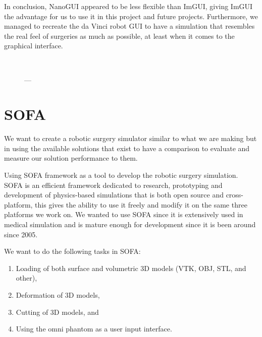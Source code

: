 \begin{center}
  \setlength{\fboxsep}{0pt}%
  \setlength{\fboxrule}{0.1pt}%
\end{center}

In conclusion, NanoGUI appeared to be less flexible than ImGUI, giving ImGUI the advantage for us to use it in this project and future projects. Furthermore, we managed to recreate the da Vinci robot GUI to have a simulation that resembles the real feel of surgeries as much as possible, at least when it comes to the graphical interface.

\begin{figure}
  \centering%
  \setlength{\fboxsep}{0pt}%
  \setlength{\fboxrule}{0.1pt}%
  \\[1ex]
  \caption{---}\label{fig:}
\end{figure}



\section{SOFA}\label{sec:sofa}
We want to create a robotic surgery simulator similar to what we are making but in using the available solutions that exist to have a comparison to evaluate and measure our solution performance to them.

Using SOFA framework as a tool to develop the robotic surgery simulation. SOFA is an efficient framework dedicated to research, prototyping and development of physics-based simulations that is both open source and cross-platform, this gives the ability to use it freely and modify it on the same three platforms we work on. We wanted to use SOFA since it is extensively used in medical simulation and is mature enough for development since it is been around since 2005.

We want to do the following tasks in SOFA:
\begin{enumerate}[1.]
  \item Loading of both surface and volumetric 3D models (VTK, OBJ, STL, and other),
  \item Deformation of 3D models,
  \item Cutting of 3D models, and
  \item Using the omni phantom as a user input interface.
\end{enumerate}

